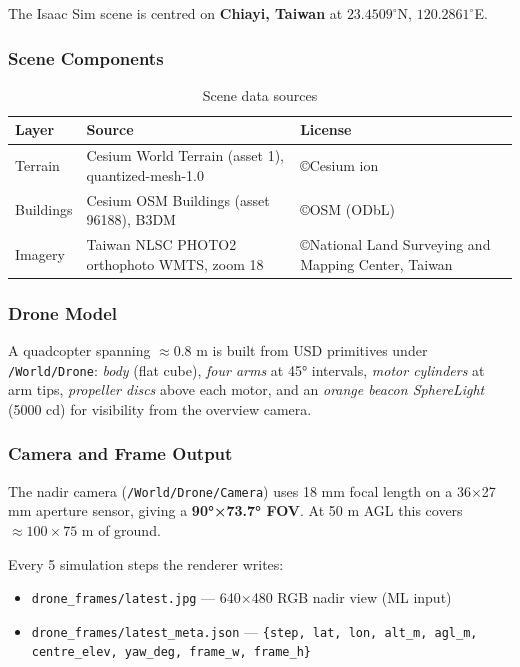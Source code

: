 \documentclass[11pt,a4paper]{article}
\begin{document}
\vspace{6pt}
The Isaac Sim scene is centred on \textbf{Chiayi, Taiwan} at $23.4509^\circ$N, $120.2861^\circ$E.

\subsubsection*{Scene Components}

\begin{table}[h]
\centering
\caption{Scene data sources}
\begin{tabular}{@{}lll@{}}
\toprule
\textbf{Layer} & \textbf{Source} & \textbf{License}\\
\midrule
Terrain & Cesium World Terrain (asset 1), quantized-mesh-1.0 & \copyright Cesium ion\\
Buildings & Cesium OSM Buildings (asset 96188), B3DM & \copyright OSM (ODbL)\\
Imagery & Taiwan NLSC PHOTO2 orthophoto WMTS, zoom 18 & \copyright National Land Surveying and Mapping Center, Taiwan\\
\bottomrule
\end{tabular}
\end{table}

\subsubsection*{Drone Model}

A quadcopter spanning $\approx 0.8$ m is built from USD primitives under \texttt{/World/Drone}:
\textit{body} (flat cube), \textit{four arms} at 45° intervals, \textit{motor cylinders} at arm tips,
\textit{propeller discs} above each motor, and an \textit{orange beacon SphereLight} (5000 cd)
for visibility from the overview camera.

\subsubsection*{Camera and Frame Output}

The nadir camera (\texttt{/World/Drone/Camera}) uses 18 mm focal length on a 36×27 mm aperture
sensor, giving a \textbf{90°×73.7° FOV}.  At 50 m AGL this covers $\approx 100\times75$ m of
ground.

Every 5 simulation steps the renderer writes:
\begin{itemize}
  \item \texttt{drone\_frames/latest.jpg} --- 640×480 RGB nadir view (ML input)
  \item \texttt{drone\_frames/latest\_meta.json} --- \texttt{\{step, lat, lon, alt\_m, agl\_m, centre\_elev, yaw\_deg, frame\_w, frame\_h\}}
\end{itemize}
\end{document}
